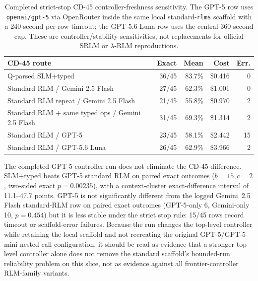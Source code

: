 \begin{table}[!t]
\centering
\small
\setlength{\tabcolsep}{3pt}
\begin{tabular}{@{}p{5.0cm}rrrr@{}}
\toprule
\textbf{CD-45 route} & \textbf{Exact} & \textbf{Mean} & \textbf{Cost} & \textbf{Err.} \\
\midrule
Q-parsed SLM+typed & 36/45 & 83.7\% & \$0.416 & 0 \\
Standard RLM / Gemini 2.5 Flash & 27/45 & 62.3\% & \$1.001 & 0 \\
Standard RLM repeat / Gemini 2.5 Flash & 21/45 & 55.8\% & \$0.970 & 2 \\
Standard RLM + same typed ops / Gemini 2.5 Flash & 31/45 & 69.3\% & \$1.314 & 2 \\
Standard RLM / GPT-5 & 23/45 & 58.1\% & \$2.442 & 15 \\
Standard RLM / GPT-5.6 Luna & 26/45 & 62.9\% & \$3.966 & 2 \\
\bottomrule
\end{tabular}
\caption{Completed strict-stop CD-45 controller-freshness sensitivity. The GPT-5 row uses \texttt{openai/gpt-5} via OpenRouter inside the same local standard-\texttt{rlms} scaffold with a 240-second per-row timeout; the GPT-5.6 Luna row uses the central 360-second cap. These are controller/stability sensitivities, not replacements for official SRLM or $\lambda$-RLM reproductions.}
\label{tab:supp-oolong-cd45-gpt5-freshness}
\end{table}

The completed GPT-5 controller run does not eliminate the CD-45 difference. SLM+typed beats GPT-5 standard RLM on paired exact outcomes ($b=15,c=2$, two-sided exact $p=0.00235$), with a context-cluster exact-difference interval of 11.1--47.7 points. GPT-5 is not significantly different from the logged Gemini~2.5 Flash standard-RLM row on paired exact outcomes (GPT-5-only 6, Gemini-only 10, $p=0.454$) but it is less stable under the strict stop rule: 15/45 rows record timeout or scaffold-error failures. Because the run changes the top-level controller while retaining the local scaffold and not recreating the original GPT-5/GPT-5-mini nested-call configuration, it should be read as evidence that a stronger top-level controller alone does not remove the standard scaffold's bounded-run reliability problem on this slice, not as evidence against all frontier-controller RLM-family variants.

